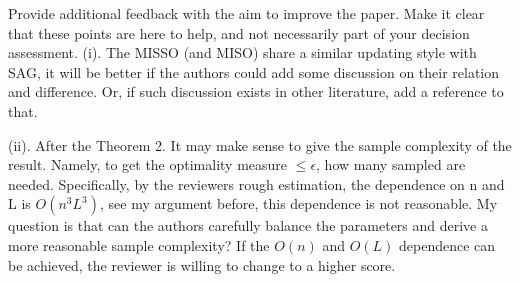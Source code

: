 \documentclass{article} %
\begin{document}
Provide additional feedback with the aim to improve the paper. Make it clear that these points are here to help, and not necessarily part of your decision assessment.
(i). The MISSO (and MISO) share a similar updating style with SAG, it will be better if the authors could add some discussion on their relation and difference. Or, if such discussion exists in other literature, add a reference to that.

(ii). After the Theorem 2. It may make sense to give the sample complexity of the result. Namely, to get the optimality measure $ \leq \epsilon$, how many sampled are needed. Specifically, by the reviewers rough estimation, the dependence on n and L is $O(n^3L^3)$, see my argument before, this dependence is not reasonable. My question is that can the authors carefully balance the parameters and derive a more reasonable sample complexity? If the $O(n)$ and $O(L)$ dependence can be achieved, the reviewer is willing to change to a higher score.
\end{document}
